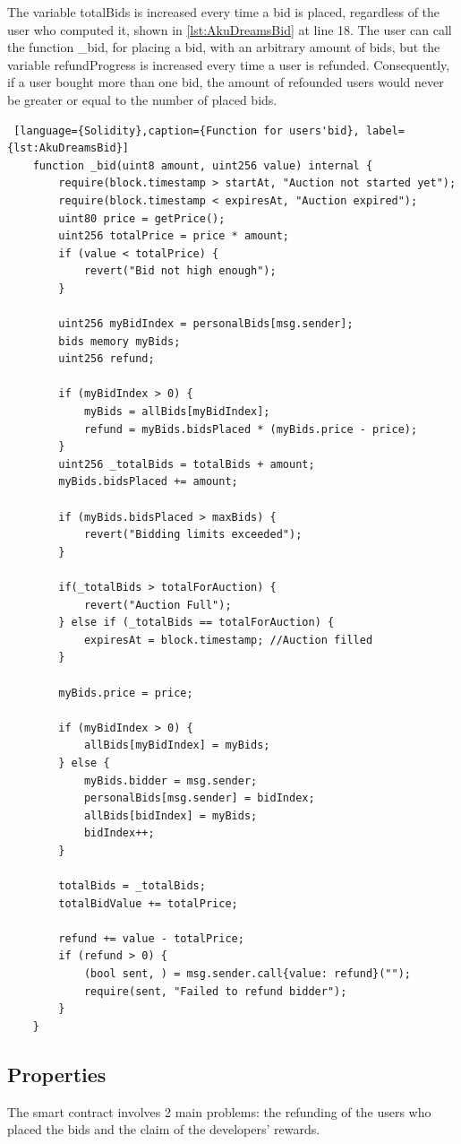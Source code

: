 The variable totalBids is increased every time a bid is placed, regardless of the user who computed it, shown in \autoref{lst:AkuDreamsBid} at line 18.
The user can call the function \_bid, for placing a bid, with an arbitrary amount of bids, but the variable refundProgress is increased every time a user is refunded. 
Consequently, if a user bought more than one bid, the amount of refounded users would never be greater or equal to the number of placed bids.
\begin{lstlisting} [language={Solidity},caption={Function for users'bid}, label={lst:AkuDreamsBid}]
    function _bid(uint8 amount, uint256 value) internal {
        require(block.timestamp > startAt, "Auction not started yet");
        require(block.timestamp < expiresAt, "Auction expired");
        uint80 price = getPrice();
        uint256 totalPrice = price * amount;
        if (value < totalPrice) {
            revert("Bid not high enough");
        }
        
        uint256 myBidIndex = personalBids[msg.sender];
        bids memory myBids;
        uint256 refund;

        if (myBidIndex > 0) {
            myBids = allBids[myBidIndex];
            refund = myBids.bidsPlaced * (myBids.price - price);
        }
        uint256 _totalBids = totalBids + amount;
        myBids.bidsPlaced += amount;

        if (myBids.bidsPlaced > maxBids) {
            revert("Bidding limits exceeded");
        }

        if(_totalBids > totalForAuction) {
            revert("Auction Full");
        } else if (_totalBids == totalForAuction) {
            expiresAt = block.timestamp; //Auction filled
        }

        myBids.price = price;

        if (myBidIndex > 0) {
            allBids[myBidIndex] = myBids;
        } else {
            myBids.bidder = msg.sender;
            personalBids[msg.sender] = bidIndex;
            allBids[bidIndex] = myBids;
            bidIndex++;
        }
        
        totalBids = _totalBids;
        totalBidValue += totalPrice;

        refund += value - totalPrice;
        if (refund > 0) {
            (bool sent, ) = msg.sender.call{value: refund}("");
            require(sent, "Failed to refund bidder");
        }
    }
\end{lstlisting}

\subsection{Properties}
The smart contract involves 2 main problems: the refunding of the users who placed the bids and the claim of the developers' rewards.

